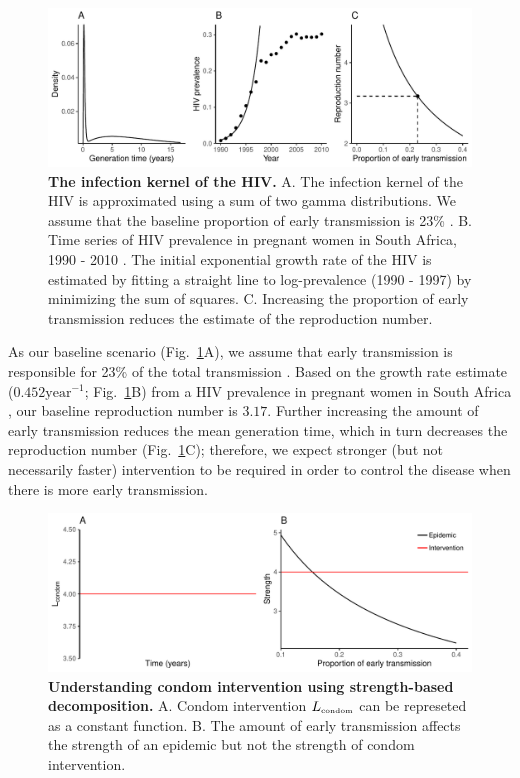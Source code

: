 \documentclass{article}\usepackage[]{graphicx}\usepackage[]{color}
\newcommand{\tsub}[2]{#1_{{\textrm{\tiny #2}}}}
\newcommand{\figref}[1]{Fig.~\ref{fig:#1}}
\newcommand{\figlab}[1]{\label{fig:#1}}
\begin{document}
\begin{figure}[!t]
\includegraphics[width=\textwidth]{../figure/figure1.pdf}
\caption{
\textbf{The infection kernel of the HIV.}
A. The infection kernel of the HIV is approximated using a sum of two gamma distributions. We assume that the baseline proportion of early transmission is 23\% \citep{hayes2006amplified}.
B. Time series of HIV prevalence in pregnant women in South Africa, 1990 - 2010 \citep{barron2013eliminating}. The initial exponential growth rate of the HIV is estimated by fitting a straight line to log-prevalence (1990 - 1997) by minimizing the sum of squares.
C. Increasing the proportion of early transmission reduces the estimate of the reproduction number.
}
\figlab{example}
\end{figure}

As our baseline scenario (\figref{example}A), we assume that early transmission is responsible for 23\% of the total transmission \citep{hayes2006amplified}.
Based on the growth rate estimate ($0.452 \textrm{year}^{-1}$; \figref{example}B) from a HIV prevalence in pregnant women in South Africa \citep{barron2013eliminating}, our baseline reproduction number is $3.17$.
Further increasing the amount of early transmission reduces the mean generation time, which in turn decreases the reproduction number (\figref{example}C);
therefore, we expect stronger (but not necessarily faster) intervention to be required in order to control the disease when there is more early transmission.

\begin{figure}[!t]
\includegraphics[width=\textwidth]{../figure/figure2.pdf}
\caption{
\textbf{Understanding condom intervention using strength-based decomposition.}
A. Condom intervention $\tsub{L}{condom}$ can be represeted as a constant function.
B. The amount of early transmission affects the strength of an epidemic but not the strength of condom intervention. 
}
\figlab{condom}
\end{figure}
\end{document}
